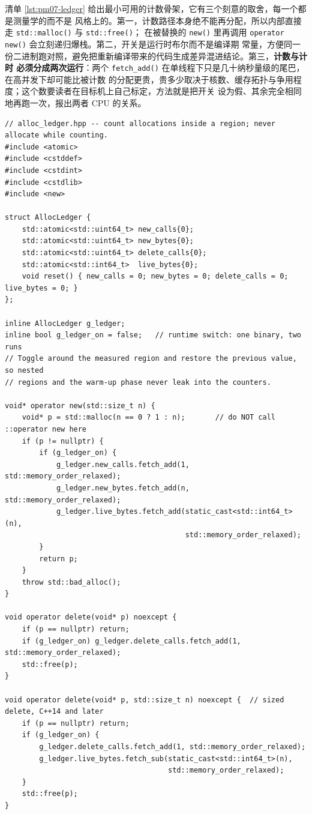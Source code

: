 \documentclass[12pt,a4paper,fontset=fandol]{ctexbook}
\newcommand{\Fn}[1]{\texttt{#1()}}
\newcommand{\Lang}[1]{\textsf{#1}}
\newcommand{\CPP}{\Lang{C++}}
\newcommand{\MCpu}{\Lang{CPU}}
\begin{document}
清单 \ref{lst:pm07-ledger} 给出最小可用的计数骨架，它有三个刻意的取舍，每一个都是测量学的而不是
风格上的。第一，计数路径本身绝不能再分配，所以内部直接走 \Fn{std::malloc} 与 \Fn{std::free}；
在被替换的 \Fn{new} 里再调用 \Fn{operator new} 会立刻递归爆栈。第二，开关是运行时布尔而不是编译期
常量，方便同一份二进制跑对照，避免把重新编译带来的代码生成差异混进结论。第三，\textbf{计数与计时
必须分成两次运行}：两个 \Fn{fetch\_add} 在单线程下只是几十纳秒量级的尾巴，在高并发下却可能比被计数
的分配更贵，贵多少取决于核数、缓存拓扑与争用程度；这个数要读者在目标机上自己标定，方法就是把开关
设为假、其余完全相同地再跑一次，报出两者 \MCpu{} 的关系。

\begin{lstlisting}[style=cppstyle, caption={分配账目计数器：替换全局 \CPP{} 分配函数并统计次数与字节数}, label={lst:pm07-ledger}]
// alloc_ledger.hpp -- count allocations inside a region; never allocate while counting.
#include <atomic>
#include <cstddef>
#include <cstdint>
#include <cstdlib>
#include <new>

struct AllocLedger {
    std::atomic<std::uint64_t> new_calls{0};
    std::atomic<std::uint64_t> new_bytes{0};
    std::atomic<std::uint64_t> delete_calls{0};
    std::atomic<std::int64_t>  live_bytes{0};
    void reset() { new_calls = 0; new_bytes = 0; delete_calls = 0; live_bytes = 0; }
};

inline AllocLedger g_ledger;
inline bool g_ledger_on = false;   // runtime switch: one binary, two runs
// Toggle around the measured region and restore the previous value, so nested
// regions and the warm-up phase never leak into the counters.

void* operator new(std::size_t n) {
    void* p = std::malloc(n == 0 ? 1 : n);       // do NOT call ::operator new here
    if (p != nullptr) {
        if (g_ledger_on) {
            g_ledger.new_calls.fetch_add(1, std::memory_order_relaxed);
            g_ledger.new_bytes.fetch_add(n, std::memory_order_relaxed);
            g_ledger.live_bytes.fetch_add(static_cast<std::int64_t>(n),
                                          std::memory_order_relaxed);
        }
        return p;
    }
    throw std::bad_alloc();
}

void operator delete(void* p) noexcept {
    if (p == nullptr) return;
    if (g_ledger_on) g_ledger.delete_calls.fetch_add(1, std::memory_order_relaxed);
    std::free(p);
}

void operator delete(void* p, std::size_t n) noexcept {  // sized delete, C++14 and later
    if (p == nullptr) return;
    if (g_ledger_on) {
        g_ledger.delete_calls.fetch_add(1, std::memory_order_relaxed);
        g_ledger.live_bytes.fetch_sub(static_cast<std::int64_t>(n),
                                      std::memory_order_relaxed);
    }
    std::free(p);
}
\end{lstlisting}
\end{document}
